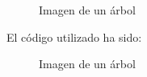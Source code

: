 \documentclass[
  letterpaper,
  DIV=11,
  numbers=noendperiod]{scrartcl}
\begin{document}
\begin{figure}[H]


\caption{\label{fig-arbol03knitr}Imagen de un árbol}

\end{figure}%

El código utilizado ha sido:

\begin{figure}[H]


\caption{\label{fig-arbol03knitr2}Imagen de un árbol}

\end{figure}%
\end{document}
